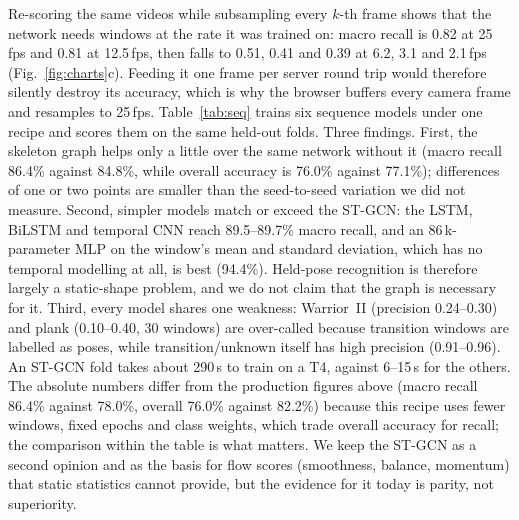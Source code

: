  Re-scoring the same videos while subsampling every $k$-th frame shows that the network needs windows at the rate it was trained on: macro recall is 0.82 at 25\,fps and 0.81 at 12.5\,fps, then falls to 0.51, 0.41 and 0.39 at 6.2, 3.1 and 2.1\,fps (Fig.~\ref{fig:charts}c). Feeding it one frame per server round trip would therefore silently destroy its accuracy, which is why the browser buffers every camera frame and resamples to 25\,fps.
 Table~\ref{tab:seq} trains six sequence models under one recipe and scores them on the same held-out folds. Three findings. First, the skeleton graph helps only a little over the same network without it (macro recall 86.4\% against 84.8\%, while overall accuracy is 76.0\% against 77.1\%); differences of one or two points are smaller than the seed-to-seed variation we did not measure. Second, simpler models match or exceed the ST-GCN: the LSTM, BiLSTM and temporal CNN reach 89.5--89.7\% macro recall, and an 86\,k-parameter MLP on the window's mean and standard deviation, which has no temporal modelling at all, is best (94.4\%). Held-pose recognition is therefore largely a static-shape problem, and we do not claim that the graph is necessary for it. Third, every model shares one weakness: Warrior~II (precision 0.24--0.30) and plank (0.10--0.40, 30 windows) are over-called because transition windows are labelled as poses, while transition/unknown itself has high precision (0.91--0.96). An ST-GCN fold takes about 290\,s to train on a T4, against 6--15\,s for the others. The absolute numbers differ from the production figures above (macro recall 86.4\% against 78.0\%, overall 76.0\% against 82.2\%) because this recipe uses fewer windows, fixed epochs and class weights, which trade overall accuracy for recall; the comparison within the table is what matters. We keep the ST-GCN as a second opinion and as the basis for flow scores (smoothness, balance, momentum) that static statistics cannot provide, but the evidence for it today is parity, not superiority.
